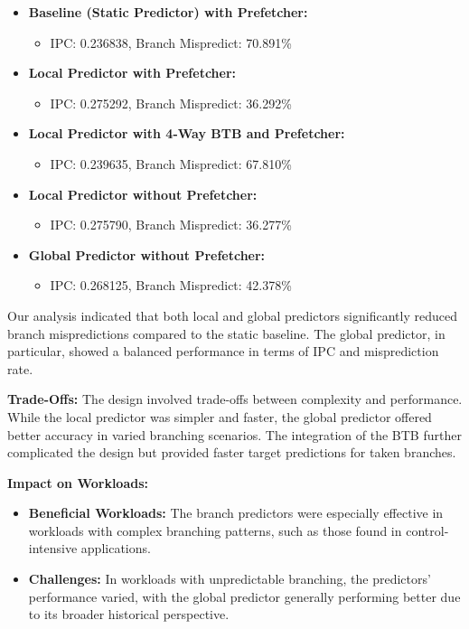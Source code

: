\documentclass[12pt, a4paper]{article}
\begin{document}
    \begin{itemize}
        \item \textbf{Baseline (Static Predictor) with Prefetcher:}
        \begin{itemize}
            \item IPC: 0.236838, Branch Mispredict: 70.891\%
        \end{itemize}
        \item \textbf{Local Predictor with Prefetcher:}
        \begin{itemize}
            \item IPC: 0.275292, Branch Mispredict: 36.292\%
        \end{itemize}
        \item \textbf{Local Predictor with 4-Way BTB and Prefetcher:}
        \begin{itemize}
            \item IPC: 0.239635, Branch Mispredict: 67.810\%
        \end{itemize}
        \item \textbf{Local Predictor without Prefetcher:}
        \begin{itemize}
            \item IPC: 0.275790, Branch Mispredict: 36.277\%
        \end{itemize}
        \item \textbf{Global Predictor without Prefetcher:}
        \begin{itemize}
            \item IPC: 0.268125, Branch Mispredict: 42.378\%
        \end{itemize}
    \end{itemize}
    
    Our analysis indicated that both local and global predictors significantly reduced branch mispredictions compared to the static baseline. The global predictor, in particular, showed a balanced performance in terms of IPC and misprediction rate.
    
    \textbf{Trade-Offs:}
    The design involved trade-offs between complexity and performance. While the local predictor was simpler and faster, the global predictor offered better accuracy in varied branching scenarios. The integration of the BTB further complicated the design but provided faster target predictions for taken branches.
    
    \textbf{Impact on Workloads:}
    \begin{itemize}
        \item \textbf{Beneficial Workloads:} The branch predictors were especially effective in workloads with complex branching patterns, such as those found in control-intensive applications.
        \item \textbf{Challenges:} In workloads with unpredictable branching, the predictors' performance varied, with the global predictor generally performing better due to its broader historical perspective.
    \end{itemize}
    
\end{document}
